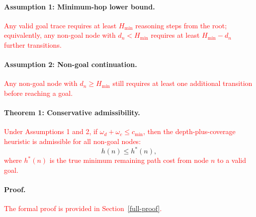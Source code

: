 \documentclass[11pt]{article}
\begin{document}
\paragraph{Assumption 1: Minimum-hop lower bound.}
\textcolor{red}{Any valid goal trace requires at least \(H_{\min}\) reasoning steps from the root; equivalently, any non-goal node with \(d_n < H_{\min}\) requires at least \(H_{\min}-d_n\) further transitions.}

\paragraph{Assumption 2: Non-goal continuation.}
\textcolor{red}{Any non-goal node with \(d_n\geq H_{\min}\) still requires at least one additional transition before reaching a goal.}

\paragraph{Theorem 1: Conservative admissibility.}
\textcolor{red}{Under Assumptions 1 and 2, if \(\omega_d+\omega_c\leq c_{\min}\), then the depth-plus-coverage heuristic is admissible for all non-goal nodes:}
\[
h(n)\leq h^*(n),
\]
\textcolor{red}{where \(h^*(n)\) is the true minimum remaining path cost from node \(n\) to a valid goal.}

\paragraph{Proof.}
\textcolor{red}{The formal proof is provided in Section~\ref{full-proof}.}
\end{document}
